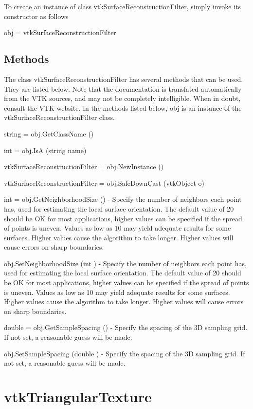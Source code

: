 To create an instance of class vtk\-Surface\-Reconstruction\-Filter, simply invoke its constructor as follows \begin{DoxyVerb}  obj = vtkSurfaceReconstructionFilter
\end{DoxyVerb}
 \hypertarget{vtkwidgets_vtkxyplotwidget_Methods}{}\subsection{Methods}\label{vtkwidgets_vtkxyplotwidget_Methods}
The class vtk\-Surface\-Reconstruction\-Filter has several methods that can be used. They are listed below. Note that the documentation is translated automatically from the V\-T\-K sources, and may not be completely intelligible. When in doubt, consult the V\-T\-K website. In the methods listed below, {\ttfamily obj} is an instance of the vtk\-Surface\-Reconstruction\-Filter class. 
\begin{DoxyItemize}
\item {\ttfamily string = obj.\-Get\-Class\-Name ()}  
\item {\ttfamily int = obj.\-Is\-A (string name)}  
\item {\ttfamily vtk\-Surface\-Reconstruction\-Filter = obj.\-New\-Instance ()}  
\item {\ttfamily vtk\-Surface\-Reconstruction\-Filter = obj.\-Safe\-Down\-Cast (vtk\-Object o)}  
\item {\ttfamily int = obj.\-Get\-Neighborhood\-Size ()} -\/ Specify the number of neighbors each point has, used for estimating the local surface orientation. The default value of 20 should be O\-K for most applications, higher values can be specified if the spread of points is uneven. Values as low as 10 may yield adequate results for some surfaces. Higher values cause the algorithm to take longer. Higher values will cause errors on sharp boundaries.  
\item {\ttfamily obj.\-Set\-Neighborhood\-Size (int )} -\/ Specify the number of neighbors each point has, used for estimating the local surface orientation. The default value of 20 should be O\-K for most applications, higher values can be specified if the spread of points is uneven. Values as low as 10 may yield adequate results for some surfaces. Higher values cause the algorithm to take longer. Higher values will cause errors on sharp boundaries.  
\item {\ttfamily double = obj.\-Get\-Sample\-Spacing ()} -\/ Specify the spacing of the 3\-D sampling grid. If not set, a reasonable guess will be made.  
\item {\ttfamily obj.\-Set\-Sample\-Spacing (double )} -\/ Specify the spacing of the 3\-D sampling grid. If not set, a reasonable guess will be made.  
\end{DoxyItemize}\hypertarget{vtkimaging_vtktriangulartexture}{}\section{vtk\-Triangular\-Texture}\label{vtkimaging_vtktriangulartexture}
